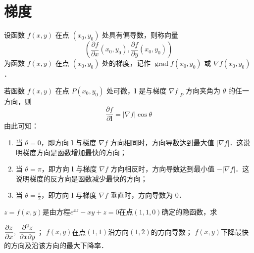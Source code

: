 \documentclass[12pt, a4paper, oneside, UTF8]{ctexbook}
\begin{document}
\section{梯度}
\begin{definition}
    设函数 $f(x, y)$ 在点 $(x_0, y_0)$ 处具有偏导数，则称向量
    \[ \left( \frac{\partial f}{\partial x}(x_0, y_0), \frac{\partial f}{\partial y}(x_0, y_0) \right) \]
    为函数 $f(x, y)$ 在点 $(x_0, y_0)$ 处的梯度，记作 $\operatorname{grad} f(x_0, y_0)$ 或 $\nabla f(x_0, y_0)$．
\end{definition}
\begin{theorem}
    若函数 $f(x, y)$ 在点 $P(x_0, y_0)$ 处可微，$\bm{l}$ 是与梯度 $\nabla f|_P$ 方向夹角为 $\theta$ 的任一方向，则
    \[ \frac{\partial f}{\partial \bm{l}} = |\nabla f| \cos \theta \]
    由此可知：
    \begin{enumerate}
        \item 当 $\theta = 0$，即方向 $\bm{l}$ 与梯度 $\nabla f$ 方向相同时，方向导数达到最大值 $|\nabla f|$．这说明梯度方向是函数增加最快的方向；
        \item 当 $\theta = \pi$，即方向 $\bm{l}$ 与梯度 $\nabla f$ 方向相反时，方向导数达到最小值 $-|\nabla f|$．这说明梯度的反方向是函数减少最快的方向；
        \item 当 $\theta = \frac{\pi}{2}$，即方向 $\bm{l}$ 与梯度 $\nabla f$ 垂直时，方向导数为 $0$．
    \end{enumerate}
\end{theorem}
\begin{example}
    $z=f(x,y)$是由方程$e^{xz}-xy+z=0$在点$(1,1,0)$确定的隐函数，求\begin{tasks}[label = (\arabic*), label-width = 1.5em, label-align = right, column-sep = 1em]
        \task $\displaystyle\pdv{z}{x},\;\pdv{z}{x}{y}$；
        \task $f(x,y)$在点$(1,1)$沿方向$(1,2)$的方向导数；
        \task $f(x,y)$下降最快的方向及沿该方向的最大下降率．
    \end{tasks}
\end{example}
\end{document}
